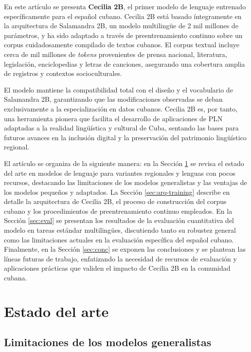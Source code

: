 \documentclass[10pt,twoside]{rcmart} %
\begin{document}
En este artículo se presenta \textbf{Cecilia 2B}, el primer modelo de lenguaje entrenado específicamente para el español cubano. Cecilia 2B está basado íntegramente en la arquitectura de Salamandra 2B, un modelo multilingüe de 2 mil millones de parámetros, y ha sido adaptado a través de preentrenamiento continuo sobre un corpus cuidadosamente compilado de textos cubanos. El corpus textual incluye cerca de mil millones de \textit{tokens} provenientes de prensa nacional, literatura, legislación, enciclopedias y letras de canciones, asegurando una cobertura amplia de registros y contextos socioculturales.

El modelo mantiene la compatibilidad total con el diseño y el vocabulario de Salamandra 2B, garantizando que las modificaciones observadas se deban exclusivamente a la especialización en datos cubanos. Cecilia 2B es, por tanto, una herramienta pionera que facilita el desarrollo de aplicaciones de PLN adaptadas a la realidad lingüística y cultural de Cuba, sentando las bases para futuros avances en la inclusión digital y la preservación del patrimonio lingüístico regional.

El artículo se organiza de la siguiente manera: en la Sección \ref{sec:state-of-art} se revisa el estado del arte en modelos de lenguaje para variantes regionales y lenguas con pocos recursos, destacando las limitaciones de los modelos generalistas y las ventajas de los modelos pequeños y adaptados. La Sección \ref{sec:arq-training} describe en detalle la arquitectura de Cecilia 2B, el proceso de construcción del corpus cubano y los procedimientos de preentrenamiento continuo empleados. En la Sección \ref{sec:eval} se presentan los resultados de la evaluación cuantitativa del modelo en tareas estándar multilingües, discutiendo tanto su robustez general como las limitaciones actuales en la evaluación específica del español cubano. Finalmente, en la Sección \ref{sec:conc} se exponen las conclusiones y se plantean las líneas futuras de trabajo, enfatizando la necesidad de recursos de evaluación y aplicaciones prácticas que validen el impacto de Cecilia 2B en la comunidad cubana.


\section{Estado del arte}\label{sec:state-of-art}

\subsection{Limitaciones de los modelos generalistas}
\end{document}
